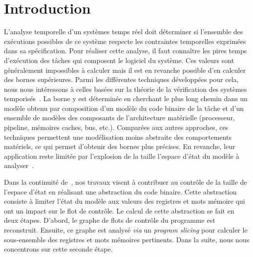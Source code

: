 \renewcommand{\baselinestretch}{1.2}
\section{Introduction}
\label{sec:introduction}

  L'analyse temporelle d'un systèmes temps réel doit déterminer si l'ensemble
  des exécutions possibles de ce système respecte les  contraintes temporelles
  exprimées dans sa spécification.  Pour réaliser cette analyse, il faut
  connaître les pires temps d'exécution des tâches qui composent le logiciel du
  système. Ces valeurs sont généralement impossibles à calculer mais il est en
  revanche possible d'en calculer des bornes supérieures.
  Parmi les différentes techniques développées pour cela, nous
  nous intéressons à celles basées sur la théorie de la vérification des
  systèmes temporisés~\cite{DOT10, CB13}. La borne y est
  déterminée en cherchant le plus long chemin dans un modèle obtenu par
  composition d'un modèle du code binaire de la tâche et d'un ensemble de
  modèles des composants de l'architecture matérielle (processeur, pipeline,
  mémoires caches, bus, etc.). Comparées aux autres approches, ces
  techniques permettent une modélisation moins abstraite des comportements
  matériels, ce qui permet d'obtenir des bornes plus
  précises. En revanche, leur application reste limitée par l'explosion
  de la taille l'espace d'état du modèle à analyser~\cite{Wil04}.

  Dans la continuité de~\cite{CB13}, nos travaux visent à
  contribuer au contrôle de la taille de l'espace d'état en réalisant une
  abstraction du code binaire. Cette abstraction consiste à limiter
  l'état du modèle aux valeurs des registres et mots mémoire qui ont un
  impact sur le flot de contrôle. Le calcul de cette abstraction se fait en
  deux étapes. D'abord, le graphe de flots de contrôle du programme est
  reconstruit. Ensuite, ce graphe est analysé \emph{via} un \emph{program slicing}
  pour calculer le sous-ensemble des registres et mots mémoires pertinents.
  Dans la suite, nous nous concentrons sur cette seconde étape.



